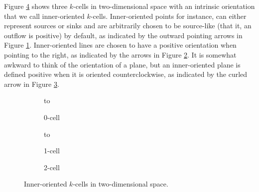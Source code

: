 Figure \ref{fig:innerExample} shows three $k$-cells in two-dimensional space with an intrinsic orientation that we call inner-oriented $k$-cells. Inner-oriented points for instance, can either represent sources or sinks and are arbitrarily chosen to be source-like (that it, an outflow is positive) by default, as indicated by the outward pointing arrows in Figure \ref{fig:inner0Cell}. Inner-oriented lines are chosen to have a positive orientation when pointing to the right, as indicated by the arrows in Figure \ref{fig:inner1Cell}. It is somewhat awkward to think of the orientation of a plane, but an inner-oriented plane is defined positive when it is oriented counterclockwise, as indicated by the curled arrow in Figure \ref{fig:inner2Cell}.
\begin{figure}[ht]
    \newsavebox\boxInner
    \centering
    \begin{subfigure}[c]{0.3\textwidth}
        \centering
        \vbox to \ht{}
        \caption{0-cell}
        \label{fig:inner0Cell}
    \end{subfigure}
    \begin{subfigure}[c]{0.3\textwidth}
        \centering
        \vbox to \ht{}
        \caption{1-cell}
        \label{fig:inner1Cell}
    \end{subfigure}
    \begin{subfigure}[c]{0.3\textwidth}
        \centering
        \centering
        \usebox{\boxInner}
        \caption{2-cell}
        \label{fig:inner2Cell}
    \end{subfigure}
    \caption{Inner-oriented $k$-cells in two-dimensional space.}
    \label{fig:innerExample}
\end{figure}

